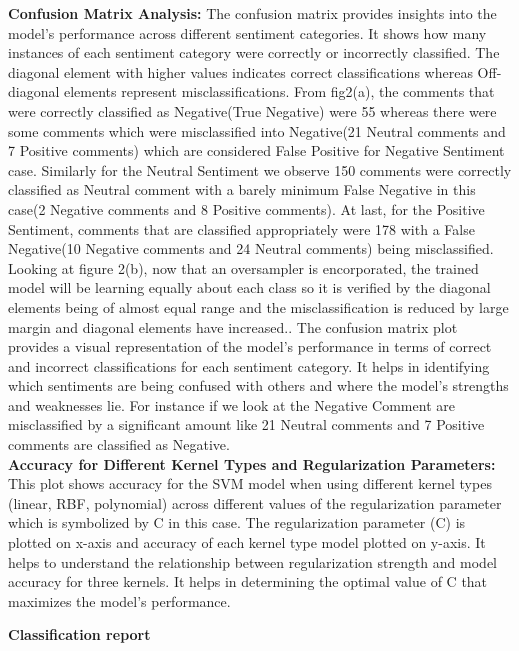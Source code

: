 \documentclass[11pt,article,oneside]{article}
\begin{document}
\textbf{Confusion Matrix Analysis:}
The confusion matrix provides insights into the model's performance across different sentiment categories. It shows how many instances of each sentiment category were correctly or incorrectly classified. The diagonal element with higher values indicates correct classifications whereas Off-diagonal elements represent misclassifications.  From fig2(a), the comments that were correctly classified as Negative(True Negative) were 55 whereas there were some comments which were misclassified into Negative(21 Neutral comments and 7 Positive comments) which are considered False Positive for Negative Sentiment case. Similarly for the Neutral Sentiment we observe 150 comments were correctly classified as Neutral comment with a barely minimum False Negative in this case(2 Negative comments and 8 Positive comments). At last, for the Positive Sentiment, comments that are classified appropriately were 178 with a False Negative(10 Negative comments and 24 Neutral comments) being misclassified. Looking at figure 2(b), now that an oversampler is encorporated, the trained model will be learning equally about each class so it is verified by the diagonal elements being of almost equal range and the misclassification is reduced by large margin and diagonal elements have increased..
The confusion matrix plot provides a visual representation of the model's performance in terms of correct and incorrect classifications for each sentiment category.
It helps in identifying which sentiments are being confused with others and where the model's strengths and weaknesses lie. For instance if we look at the Negative Comment are misclassified by a significant amount like 21 Neutral comments and 7 Positive comments are classified as Negative. \\


\textbf{Accuracy for Different Kernel Types and Regularization Parameters:}
This plot shows accuracy for the SVM model when using different kernel types (linear, RBF, polynomial) across different values of the regularization parameter which is symbolized by C\citep{SVMparameterC} in this case. The regularization parameter (C) is plotted on x-axis and accuracy of each kernel type model plotted on y-axis. It helps to understand the relationship between regularization strength and model accuracy for three kernels. It helps in determining the optimal value of C that maximizes the model's performance.

\textbf{Classification report}
\end{document}
